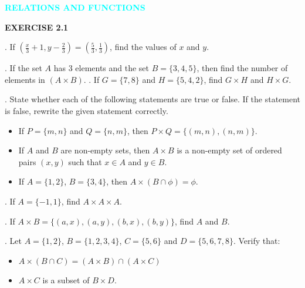 \documentclass[11pt]{article}
\begin{document}
\thispagestyle{firstpage}


\vspace*{0.5cm}

\begin{center}
    \Large\textcolor{cyan}{\textbf{\large RELATIONS AND FUNCTIONS}}
\end{center}

\begin{center}
\begin{tcolorbox}[
  enhanced,
  width=0.25\textwidth,   
  colback=cyan!20,
  colframe=cyan!80!black,
  boxrule=1.2pt,
  arc=0mm,                
  left=10pt,
  right=10pt,
  top=8pt,
  bottom=8pt
]
\centering
\textbf{\textcolor{cyan!80!black}{EXERCISE 2.1}}
\end{tcolorbox}
\end{center}


. If $\left(\frac{x}{3}+1, y-\frac{2}{3}\right)=\left(\frac{5}{3}, \frac{1}{3}\right)$, find the values of $x$ and $y$.

. If the set $A$ has 3 elements and the set $B=\{3,4,5\}$, then find the number of elements in $(A\times B)$.
. If $G=\{7,8\}$ and $H=\{5,4,2\}$, find $G\times H$ and $H\times G$.

. State whether each of the following statements are true or false. If the statement is false, rewrite the given statement correctly.
\begin{itemize}
    \item[(i)] If $P=\{m,n\}$ and $Q=\{n,m\}$, then $P\times Q=\{(m,n),(n,m)\}$.
    \item[(ii)] If $A$ and $B$ are non-empty sets, then $A\times B$ is a non-empty set of ordered pairs $(x, y)$ such that $x\in A$ and $y\in B$.
    \item[(iii)] If $A=\{1,2\}$, $B=\{3,4\}$, then $A\times(B\cap\phi)=\phi$.
\end{itemize}

. If $A=\{-1,1\}$, find $A\times A\times A$.

. If $A\times B=\{(a,x),(a,y),(b,x),(b,y)\}$, find $A$ and $B$.

. Let $A=\{1,2\}$, $B=\{1,2,3,4\}$, $C=\{5,6\}$ and $D=\{5,6,7,8\}$. Verify that:
\begin{itemize}
    \item[(i)] $A\times(B\cap C)=(A\times B)\cap(A\times C)$
    \item[(ii)] $A\times C$ is a subset of $B\times D$.
\end{itemize}
\end{document}
